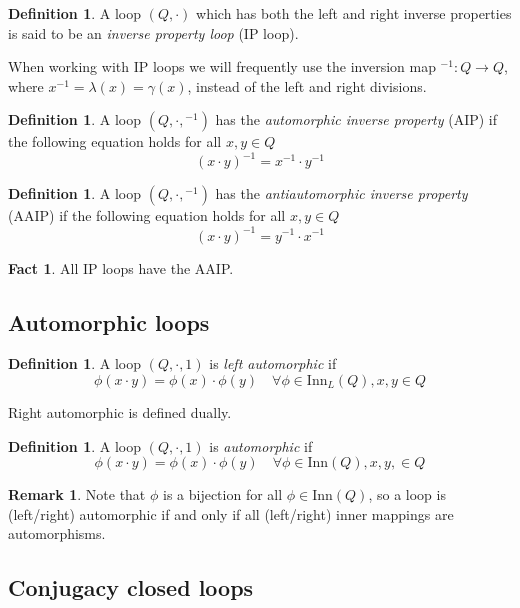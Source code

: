 \documentclass[12pt, twoside, openright]{report}
\theoremstyle{definition}
\newtheorem{fct}[thm]{Fact}
\newtheorem{dfn}[thm]{Definition}
\newtheorem*{rmk}{Remark}
\newcommand{\inn}{\text{Inn}}       %
\begin{document}
\begin{dfn}
  A loop $(Q, \cdot)$ which has both the left and right inverse properties is said to be an \emph{inverse property loop}
    (IP loop).
\end{dfn}

When working with IP loops we will frequently use the inversion map ${}^{-1}:Q\to Q$, where
  $x^{-1} = \lambda(x) = \gamma(x)$, instead of the left and right divisions.

\begin{dfn}
  A loop $(Q, \cdot, {}^{-1})$ has the \emph{automorphic inverse property} (AIP) if the following equation holds
    for all $x, y\in Q$
  \[(x\cdot y)^{-1} = x^{-1}\cdot y^{-1}\]
\end{dfn}

\begin{dfn}
  A loop $(Q, \cdot, {}^{-1})$ has the \emph{antiautomorphic inverse property} (AAIP) if the following equation
    holds for all $x, y\in Q$
  \[(x\cdot y)^{-1} = y^{-1}\cdot x^{-1}\]
\end{dfn}

\begin{fct}
  All IP loops have the AAIP.
\end{fct}

\subsection{Automorphic loops}

\begin{dfn}
  A loop $(Q, \cdot, 1)$ is \emph{left automorphic} if
  \[\phi(x\cdot y) = \phi(x)\cdot \phi(y)\quad \forall \phi\in\inn_L(Q), x, y\in Q\]
\end{dfn}

Right automorphic is defined dually.

\begin{dfn}
  A loop $(Q, \cdot, 1)$ is \emph{automorphic} if
  \[\phi(x\cdot y) = \phi(x)\cdot \phi(y)\quad \forall \phi\in\inn(Q), x, y,\in Q\]
\end{dfn}

\begin{rmk}
  Note that $\phi$ is a bijection for all $\phi\in\inn(Q)$, so a loop is (left/right) automorphic if and only if
    all (left/right) inner mappings are automorphisms.
\end{rmk}

\subsection{Conjugacy closed loops}
\end{document}

